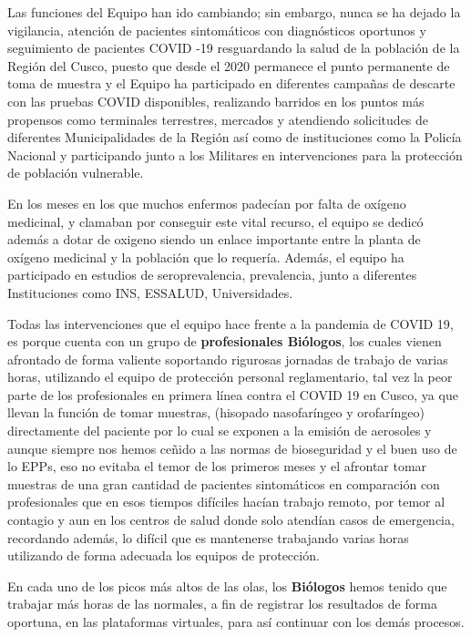 \documentclass[12pt,a4paper,openany]{book}
\begin{document}
Las funciones del Equipo han ido cambiando; sin embargo, nunca se ha dejado la vigilancia, atención de pacientes sintomáticos con diagnósticos oportunos y seguimiento de pacientes COVID -19 resguardando la salud de la población de la Región del Cusco, puesto que desde el 2020 permanece el punto permanente de toma de muestra y el Equipo ha participado en diferentes campañas de descarte con las pruebas COVID disponibles, realizando barridos en los puntos más propensos como terminales terrestres, mercados y atendiendo solicitudes de diferentes Municipalidades de la Región así como de instituciones como la Policía Nacional y participando junto a los Militares en intervenciones para la protección de población vulnerable.

En los meses en los que muchos enfermos padecían por falta de oxígeno medicinal, y clamaban por conseguir este vital recurso, el equipo se dedicó además a dotar de oxigeno siendo un enlace importante entre la planta de oxígeno medicinal y la población que lo requería. 
Además, el equipo ha participado  en estudios de  seroprevalencia, prevalencia, junto a diferentes Instituciones como INS, ESSALUD, Universidades.

Todas las intervenciones que el equipo hace frente a la pandemia de COVID 19, es porque cuenta con un grupo de \textbf{profesionales Biólogos}, los cuales vienen afrontado de forma valiente soportando rigurosas jornadas de trabajo de varias horas, utilizando el equipo de protección personal reglamentario, tal vez la peor parte de los profesionales en primera línea contra el COVID 19 en Cusco, ya que llevan la función de tomar muestras, (hisopado nasofaríngeo y orofaríngeo) directamente del paciente por lo cual se exponen a la emisión de aerosoles y aunque siempre nos hemos ceñido a las normas de bioseguridad y el buen uso de lo EPPs, eso no evitaba el temor de los primeros meses y el afrontar tomar muestras de una gran cantidad de pacientes sintomáticos en comparación con profesionales que en esos tiempos difíciles hacían trabajo remoto, por temor al contagio y aun en los centros de salud donde solo atendían casos de emergencia, recordando además, lo difícil que es mantenerse trabajando varias horas utilizando de forma adecuada los equipos de protección. 

En cada uno de los picos más altos de las olas, los \textbf{Biólogos} hemos tenido que trabajar más horas de las normales, a fin de registrar los resultados de forma oportuna, en las plataformas virtuales, para así continuar con los demás procesos. 
\end{document}
